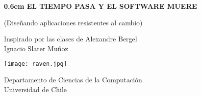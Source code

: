 \begin{titlepage}
  \clearpage
  \newcommand\nbvspace[1][3]{\vspace*{\stretch{#1}}}
  \newcommand\nbstretchyspace{\spaceskip0.5em plus 0.25em minus 0.25em}
  \newcommand{\nbtitlestretch}{\spaceskip0.6em}
  \pagestyle{empty}
  
  \begin{center}
    \bfseries
    \nbvspace[1]
    \Huge
    {
      \nbtitlestretch\huge
      EL TIEMPO PASA Y EL SOFTWARE MUERE
    }

    {\LARGE (Diseñando aplicaciones resistentes al cambio)}
    
    \nbvspace[1]
    \normalsize
    Inspirado por las clases de Alexandre Bergel
    \nbvspace[1]\\
    \Large Ignacio Slater Muñoz\\[0.5em]

    \nbvspace[2]

    \texttt{[image: raven.jpg]}
    \nbvspace[3]
    \normalsize

    Departamento de Ciencias de la Computación\\
    \large
    Universidad de Chile
    \nbvspace[1]
  \end{center}
\end{titlepage}